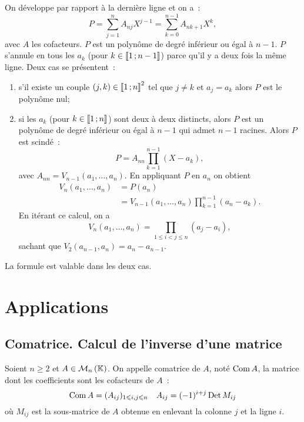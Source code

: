 On développe par rapport à la dernière ligne et on a~:
\begin{equation}
  P = \sum_{j=1}^n A_{nj} X^{j-1}=\sum_{k=0}^{n-1} A_{n k+1} X^{k},
\end{equation}
avec \(A\) les cofacteurs. \(P\) est un polynôme de degré inférieur ou 
égal à \(n-1\). \(P\) s'annule en tous les \(a_k\) (pour \(k \in 
\mathopen{\llbracket}1\mathclose{}\mathpunct{};n-1\mathclose{\rrbracket}\)) parce qu'il y a deux fois la même ligne. Deux 
cas se présentent~:
\begin{enumerate}
  \item s'il existe un couple \((j,k) \in \mathopen{\llbracket}1\mathclose{}\mathpunct{};n\mathclose{\rrbracket}^2\) tel 
    que \(j \neq k\) et \(a_j=a_k\) alors \(P\) est le polynôme nul;
  \item si les \(a_k\) (pour \(k \in \mathopen{\llbracket}1\mathclose{}\mathpunct{};n\mathclose{\rrbracket}\)) sont deux 
    à deux distincts, alors \(P\) est un polynôme de degré inférieur ou 
    égal à \(n-1\) qui admet \(n-1\) racines. Alors \(P\) est scindé~:
    \begin{equation}
      P = A_{nn} \prod_{k=1}^{n-1}(X-a_k),
    \end{equation}
    avec \(A_{nn} = V_{n-1}(a_1, \ldots, a_n)\). En appliquant \(P\) en 
    \(a_n\) on obtient
    \begin{align}
      V_{n}(a_1, \ldots, a_n) &= P(a_n) \\
      &=V_{n-1}(a_1, \ldots, a_n) \prod_{k=1}^{n-1}(a_n-a_k).
    \end{align}
    En itérant ce calcul, on a
    \begin{equation}
      V_{n}(a_1, \ldots, a_n) = \prod_{1 \le i < j \leqslant n} (a_j-a_i),
    \end{equation}
    sachant que \(V_2(a_{n-1},a_n)=a_n-a_{n-1}\).
\end{enumerate}

La formule est valable dans les deux cas.

\section{Applications}

\subsection{Comatrice. Calcul de l'inverse d'une matrice}

\begin{defdef}
  Soient \(n \geqslant 2\) et \(A \in \mathcal{M}_{n}\left(\mathbb{K}\right)\). On appelle comatrice 
  de \(A\), noté \(\operatorname{Com} A\), la matrice dont les coefficients sont les 
  cofacteurs de \(A\)~:
  \begin{equation}
    \operatorname{Com} A = (A_{ij})_{1 \leqslant i,j \leqslant n} \quad 
    A_{ij}=(-1)^{i+j} \operatorname{Det} M_{ij}
  \end{equation}
  où \(M_{ij}\) est la sous-matrice de \(A\) obtenue en enlevant la 
  colonne \(j\) et la ligne \(i\).
\end{defdef}

